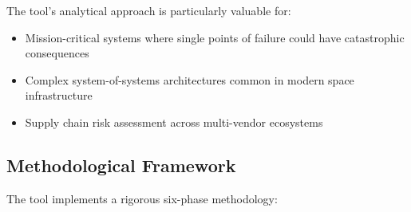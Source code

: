 \documentclass[binding=0.6cm]{sapthesis}
\begin{document}
The tool's analytical approach is particularly valuable for:

\begin{itemize}
\item Mission-critical systems where single points of failure could have catastrophic consequences
\item Complex system-of-systems architectures common in modern space infrastructure
\item Supply chain risk assessment across multi-vendor ecosystems
\end{itemize}

\subsection{Methodological Framework}

The tool implements a rigorous six-phase methodology:
\end{document}
